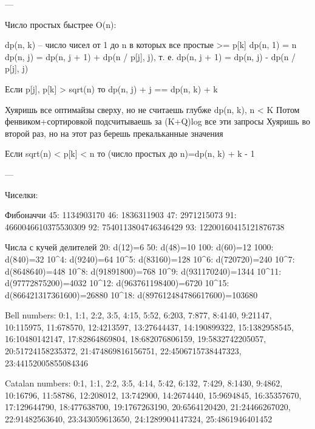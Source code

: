 ---

Число простых быстрее O(n): 

dp(n, k) -- число чисел от 1 до n в которых все простые >= p[k]
dp(n, 1) = n
dp(n, j) = dp(n, j + 1) + dp(n / p[j], j), т. е. 
dp(n, j + 1) = dp(n, j) - dp(n / p[j], j)

Если p[j], p[k] > sqrt(n) то dp(n, j) + j == dp(n, k) + k

Хуяришь все оптимайзы сверху, но не считаешь глубже dp(n, k), n < K
Потом фенвиком+сортировкой подсчитываешь за (K+Q)log все эти запросы
Хуяришь во второй раз, но на этот раз берешь прекальканные значения

Если sqrt(n) < p[k] < n то (число простых до n)=dp(n, k) + k - 1

---

Чиселки: 

Фибоначчи
45:  1134903170
46:  1836311903
47:  2971215073
91:  4660046610375530309
92:  7540113804746346429
93:  12200160415121876738

Числа с кучей делителей
20: d(12)=6
50: d(48)=10
100: d(60)=12
1000: d(840)=32
10^4: d(9240)=64
10^5: d(83160)=128
10^6: d(720720)=240
10^7: d(8648640)=448
10^8: d(91891800)=768
10^9: d(931170240)=1344
10^{11}: d(97772875200)=4032
10^{12}: d(963761198400)=6720
10^{15}: d(866421317361600)=26880
10^{18}: d(897612484786617600)=103680

Bell numbers:
0:1, 1:1, 2:2, 3:5, 4:15, 5:52, 6:203, 7:877, 8:4140, 9:21147,
10:115975, 11:678570, 12:4213597, 13:27644437, 14:190899322,
15:1382958545, 16:10480142147, 17:82864869804, 18:682076806159,
19:5832742205057, 20:51724158235372, 21:474869816156751,
22:4506715738447323, 23:44152005855084346

Catalan numbers:
0:1, 1:1, 2:2, 3:5, 4:14, 5:42, 6:132, 7:429, 8:1430, 9:4862,
10:16796, 11:58786, 12:208012, 13:742900, 14:2674440,
15:9694845, 16:35357670, 17:129644790, 18:477638700,
19:1767263190, 20:6564120420, 21:24466267020, 22:91482563640,
23:343059613650, 24:1289904147324, 25:4861946401452
